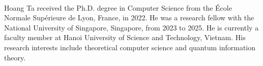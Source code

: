 \documentclass[journal]{IEEEtran}
\theoremstyle{definition}
\theoremstyle{definition}
\begin{document}
%
%
%
%
%
%
%
%
%
%
%





%
%



\
\begin{IEEEbiographynophoto}{Hoang Ta}
received the Ph.D. degree in Computer Science from the École Normale Supérieure de Lyon, France, in 2022. He was a research fellow with the National University of Singapore, Singapore, from 2023 to 2025. He is currently a faculty member at Hanoi University of Science and Technology, Vietnam. His research interests include theoretical computer science and quantum information theory.
\end{IEEEbiographynophoto}
\end{document}

